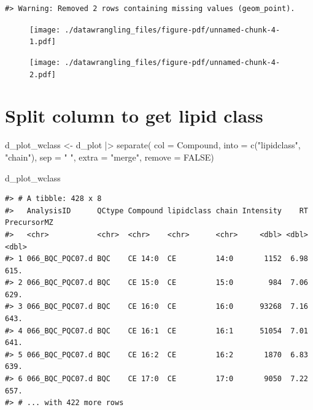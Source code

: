\documentclass[
  letterpaper,
  DIV=11,
  numbers=noendperiod]{scrreprt}
\newenvironment{Shaded}{\begin{snugshade}}{\end{snugshade}}
\newcommand{\AttributeTok}[1]{\textcolor[rgb]{0.40,0.45,0.13}{#1}}
\newcommand{\ConstantTok}[1]{\textcolor[rgb]{0.56,0.35,0.01}{#1}}
\newcommand{\FunctionTok}[1]{\textcolor[rgb]{0.28,0.35,0.67}{#1}}
\newcommand{\NormalTok}[1]{\textcolor[rgb]{0.00,0.23,0.31}{#1}}
\newcommand{\OtherTok}[1]{\textcolor[rgb]{0.00,0.23,0.31}{#1}}
\newcommand{\SpecialCharTok}[1]{\textcolor[rgb]{0.37,0.37,0.37}{#1}}
\newcommand{\StringTok}[1]{\textcolor[rgb]{0.13,0.47,0.30}{#1}}
\begin{document}
\begin{verbatim}
#> Warning: Removed 2 rows containing missing values (geom_point).
\end{verbatim}

\begin{figure}[H]

{\centering \texttt{[image: ./datawrangling\_files/figure-pdf/unnamed-chunk-4-1.pdf]}

}

\end{figure}

\begin{figure}[H]

{\centering \texttt{[image: ./datawrangling\_files/figure-pdf/unnamed-chunk-4-2.pdf]}

}

\end{figure}

\hypertarget{split-column-to-get-lipid-class}{%
\section{Split column to get lipid
class}\label{split-column-to-get-lipid-class}}

\begin{Shaded}
\begin{Highlighting}[]
\NormalTok{d\_plot\_wclass }\OtherTok{\textless{}{-}}\NormalTok{ d\_plot }\SpecialCharTok{|\textgreater{}} 
  \FunctionTok{separate}\NormalTok{(}
    \AttributeTok{col =}\NormalTok{ Compound,}
    \AttributeTok{into =} \FunctionTok{c}\NormalTok{(}\StringTok{"lipidclass"}\NormalTok{, }\StringTok{"chain"}\NormalTok{), }
    \AttributeTok{sep =} \StringTok{" "}\NormalTok{,}
    \AttributeTok{extra =} \StringTok{"merge"}\NormalTok{, }
    \AttributeTok{remove =} \ConstantTok{FALSE}\NormalTok{) }
    
\NormalTok{d\_plot\_wclass}
\end{Highlighting}
\end{Shaded}

\begin{verbatim}
#> # A tibble: 428 x 8
#>   AnalysisID      QCtype Compound lipidclass chain Intensity    RT PrecursorMZ
#>   <chr>           <chr>  <chr>    <chr>      <chr>     <dbl> <dbl>       <dbl>
#> 1 066_BQC_PQC07.d BQC    CE 14:0  CE         14:0       1152  6.98        615.
#> 2 066_BQC_PQC07.d BQC    CE 15:0  CE         15:0        984  7.06        629.
#> 3 066_BQC_PQC07.d BQC    CE 16:0  CE         16:0      93268  7.16        643.
#> 4 066_BQC_PQC07.d BQC    CE 16:1  CE         16:1      51054  7.01        641.
#> 5 066_BQC_PQC07.d BQC    CE 16:2  CE         16:2       1870  6.83        639.
#> 6 066_BQC_PQC07.d BQC    CE 17:0  CE         17:0       9050  7.22        657.
#> # ... with 422 more rows
\end{verbatim}
\end{document}
